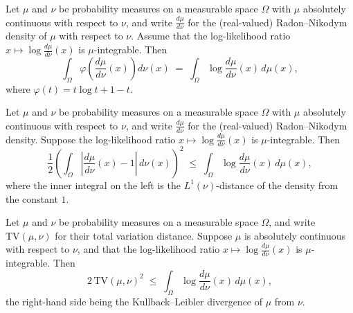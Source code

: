 \begin{theorem}
\label{CommunicationComplexity.integral_klFun_rnDeriv_eq_kl_integral}
\leanok
{}
Let $\mu$ and $\nu$ be probability measures on a measurable space $\Omega$ with $\mu$
absolutely continuous with respect to $\nu$, and write $\frac{d\mu}{d\nu}$ for the
(real-valued) Radon–Nikodym density of $\mu$ with respect to $\nu$. Assume that the
log-likelihood ratio $x \mapsto \log\frac{d\mu}{d\nu}(x)$ is $\mu$-integrable. Then
\[
  \int_\Omega \varphi\!\left(\frac{d\mu}{d\nu}(x)\right) d\nu(x)
  \;=\;
  \int_\Omega \log\frac{d\mu}{d\nu}(x)\, d\mu(x),
\]
where $\varphi(t) = t\log t + 1 - t$.
\end{theorem}

\begin{theorem}
\label{CommunicationComplexity.density_l1_pinsker_le_kl_integral}
\leanok
{}
Let $\mu$ and $\nu$ be probability measures on a measurable space $\Omega$ with $\mu$
absolutely continuous with respect to $\nu$, and write $\frac{d\mu}{d\nu}$ for the
(real-valued) Radon–Nikodym density. Suppose the log-likelihood ratio $x \mapsto
\log\frac{d\mu}{d\nu}(x)$ is $\mu$-integrable. Then
\[
\frac{1}{2}\left(\int_{\Omega} \left|\frac{d\mu}{d\nu}(x) - 1\right|\,d\nu(x)\right)^{2}
  \;\le\;
  \int_{\Omega} \log\frac{d\mu}{d\nu}(x)\,d\mu(x),
\]
where the inner integral on the left is the $L^{1}(\nu)$-distance of the density from
the constant $1$.
\end{theorem}

\begin{theorem}
\label{CommunicationComplexity.real_pinsker_inequality_of_ac_of_integrable}
\leanok
{}
Let $\mu$ and $\nu$ be probability measures on a measurable space $\Omega$, and write
$\mathrm{TV}(\mu,\nu)$ for their total variation distance. Suppose $\mu$ is absolutely
continuous with respect to $\nu$, and that the log-likelihood ratio $x \mapsto
\log\frac{d\mu}{d\nu}(x)$ is $\mu$-integrable. Then
\[
  2\,\mathrm{TV}(\mu,\nu)^2 \;\le\; \int_\Omega \log\frac{d\mu}{d\nu}(x)\,d\mu(x),
\]
the right-hand side being the Kullback–Leibler divergence of $\mu$ from $\nu$.
\end{theorem}

